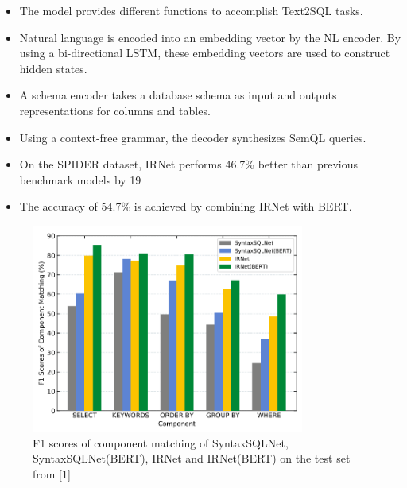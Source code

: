 \begin{itemize}
    \item The model provides different functions to accomplish Text2SQL tasks.
    \item Natural language is encoded into an embedding vector by the NL encoder. By using a bi-directional LSTM, these embedding vectors are used to construct hidden states.
    \item A schema encoder takes a database schema as input and outputs representations for columns and tables.
    \item Using a context-free grammar, the decoder synthesizes SemQL queries.
    \item On the SPIDER dataset, IRNet performs 46.7\% better than previous benchmark models by 19%
    \item The accuracy of 54.7\% is achieved by combining IRNet with BERT.
\end{itemize}

\begin{figure}[htb]
    \centering
    \includegraphics[width=0.8\textwidth]{pics/IRNet/f1}
    \caption{F1 scores of component matching of SyntaxSQLNet, SyntaxSQLNet(BERT), IRNet and IRNet(BERT) on the test set from [1]}
    \label{fig:f1}
\end{figure}
